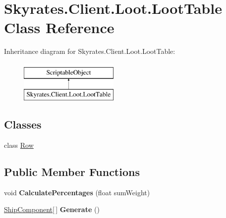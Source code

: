 \hypertarget{class_skyrates_1_1_client_1_1_loot_1_1_loot_table}{\section{Skyrates.\-Client.\-Loot.\-Loot\-Table Class Reference}
\label{class_skyrates_1_1_client_1_1_loot_1_1_loot_table}
}
Inheritance diagram for Skyrates.\-Client.\-Loot.\-Loot\-Table\-:\begin{figure}[H]
\begin{center}
\leavevmode
\includegraphics[height=2.000000cm]{class_skyrates_1_1_client_1_1_loot_1_1_loot_table}
\end{center}
\end{figure}
\subsection*{Classes}
\begin{DoxyCompactItemize}
\item 
class \hyperlink{class_skyrates_1_1_client_1_1_loot_1_1_loot_table_1_1_row}{Row}
\end{DoxyCompactItemize}
\subsection*{Public Member Functions}
\begin{DoxyCompactItemize}
\item 
\hypertarget{class_skyrates_1_1_client_1_1_loot_1_1_loot_table_aa7489e9d16bf34c00b173e475a1cb9a7}{void {\bfseries Calculate\-Percentages} (float sum\-Weight)}\label{class_skyrates_1_1_client_1_1_loot_1_1_loot_table_aa7489e9d16bf34c00b173e475a1cb9a7}

\item 
\hypertarget{class_skyrates_1_1_client_1_1_loot_1_1_loot_table_aa1aadc13a10c296568aeda3cb1f46a84}{\hyperlink{class_skyrates_1_1_client_1_1_ship_1_1_ship_component}{Ship\-Component}\mbox{[}$\,$\mbox{]} {\bfseries Generate} ()}\label{class_skyrates_1_1_client_1_1_loot_1_1_loot_table_aa1aadc13a10c296568aeda3cb1f46a84}

\end{DoxyCompactItemize}
